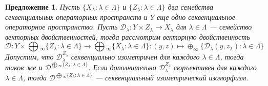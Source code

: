 \documentclass[12pt]{article}
\newtheorem{proposition}[theorem]{Предложение}
\begin{document}
\begin{proposition}\label{PrVectDualProdComp} Пусть $\{X_\lambda:\lambda\in\Lambda\}$ и $\{Z_\lambda:\lambda\in\Lambda\}$ два семейства секвенциальных операторных пространств и $Y$ еще одно секвенциальное операторное пространство. Пусть $\mathcal{D}_\lambda: Y\times Z_\lambda\to X_\lambda$ для $\lambda\in\Lambda$ --- семейство векторных двойственностей, тогда рассмотрим векторную двойственность
$$
\mathcal{D}:Y\times\bigoplus{}_\infty\{Z_\lambda:\lambda\in\Lambda\}\to\bigoplus{}_\infty\{X_\lambda:\lambda\in\Lambda\}:(y,z)\mapsto\oplus_\infty\{\mathcal{D}_\lambda(y,z_\lambda):\lambda\in\Lambda\}
$$
Допустим, что $\mathcal{D}_\lambda^{Z_\lambda}$ секвенциально изометричен для каждого $\lambda\in\Lambda$, тогда таков же и $\mathcal{D}^{\bigoplus{}_\infty\{Z_\lambda:\lambda\in\Lambda\}}$. Если дополнительно $\mathcal{D}_\lambda^{Z_\lambda}$ сюръективен для каждого $\lambda\in\Lambda$, тогда $\mathcal{D}^{\bigoplus{}_\infty\{Z_\lambda:\lambda\in\Lambda\}}$ --- секвенциальный изометрический изоморфизм.
\end{proposition}
\end{document}
